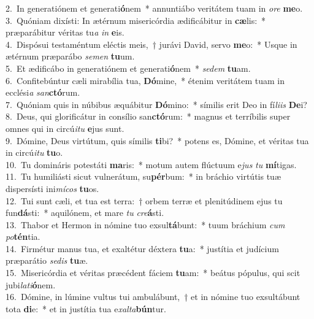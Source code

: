 {2.~}In generatiónem et generati\textbf{ó}nem~* annuntiábo veritátem tuam in \textit{o}\textit{re} \textbf{me}o.\\
{3.~}Quóniam dixísti: In ætérnum misericórdia ædificábitur in \textbf{cæ}lis:~* præparábitur véritas tu\textit{a} \textit{in} \textbf{e}is.\\
{4.~}Dispósui testaméntum eléctis meis,~† jurávi David, servo \textbf{me}o:~* Usque in ætérnum præparábo \textit{se}\textit{men} \textbf{tu}um.\\
{5.~}Et ædificábo in generatiónem et generati\textbf{ó}nem~* \textit{se}\textit{dem} \textbf{tu}am.\\
{6.~}Confitebúntur cæli mirabília tua, \textbf{Dó}mine,~* étenim veritátem tuam in ecclési\textit{a} \textit{san}\textbf{ctó}rum.\\
{7.~}Quóniam quis in núbibus æquábitur \textbf{Dó}mino:~* símilis erit Deo in fí\textit{li}\textit{is} \textbf{De}i?\\
{8.~}Deus, qui glorificátur in consílio san\textbf{ctó}rum:~* magnus et terríbilis super omnes qui in circú\textit{i}\textit{tu} \textbf{e}jus sunt.\\
{9.~}Dómine, Deus virtútum, quis símilis \textbf{ti}bi?~* potens es, Dómine, et véritas tua in circú\textit{i}\textit{tu} \textbf{tu}o.\\
{10.~}Tu domináris potestáti \textbf{ma}ris:~* motum autem flúctuum e\textit{jus} \textit{tu} \textbf{mí}tigas.\\
{11.~}Tu humiliásti sicut vulnerátum, su\textbf{pér}bum:~* in bráchio virtútis tuæ dispersísti ini\textit{mí}\textit{cos} \textbf{tu}os.\\
{12.~}Tui sunt cæli, et tua est terra:~† orbem terræ et plenitúdinem ejus tu fun\textbf{dá}sti:~* aquilónem, et mare \textit{tu} \textit{cre}\textbf{á}sti.\\
{13.~}Thabor et Hermon in nómine tuo exsul\textbf{tá}bunt:~* tuum bráchium \textit{cum} \textit{po}\textbf{tén}tia.\\
{14.~}Firmétur manus tua, et exaltétur déxtera \textbf{tu}a:~* justítia et judícium præparátio \textit{se}\textit{dis} \textbf{tu}æ.\\
{15.~}Misericórdia et véritas præcédent fáciem \textbf{tu}am:~* beátus pópulus, qui scit jubi\textit{la}\textit{ti}\textbf{ó}nem.\\
{16.~}Dómine, in lúmine vultus tui ambulábunt,~† et in nómine tuo exsultábunt tota \textbf{di}e:~* et in justítia tua e\textit{xal}\textit{ta}\textbf{bún}tur.\\
